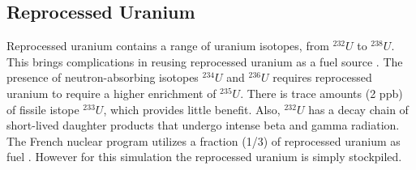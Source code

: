 \subsection{Reprocessed Uranium}
Reprocessed uranium contains a range of uranium isotopes, from $^{232}U$ to $^{238}U$.
This brings complications in reusing reprocessed uranium as a fuel source \cite{IAEA_management_2007}.
The presence of neutron-absorbing isotopes $^{234}U$ and $^{236}U$ requires reprocessed uranium
to require a higher enrichment of $^{235}U$. There is trace amounts (2 ppb) of fissile istope $^{233}U$,
which provides little benefit.  
Also, $^{232}U$ has a decay chain of short-lived
daughter products that undergo intense beta and gamma radiation.
The French nuclear program utilizes a fraction (1/3) of reprocessed uranium as fuel \cite{IAEA_management_200&}.
However for this simulation the reprocessed uranium is simply stockpiled.



